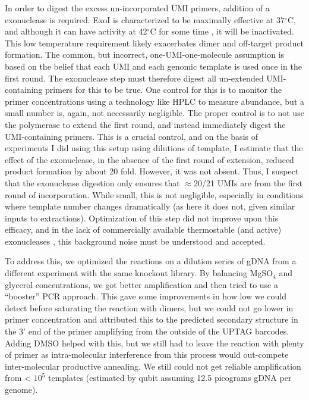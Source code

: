 In order to digest the
excess un-incorporated UMI primers, addition of a
exonuclease is required. 
ExoI is characterized to be maximally effective at
37\(^{\circ}\)C, and although it can have activity at 42\(^{\circ}\)C
for some time \parencite{fei2015structural}, it
will be inactivated. This low temperature requirement likely exacerbates
dimer and off-target product formation.
The common, but incorrect, one-UMI-one-molecule assumption is based on
the belief that each UMI and each genomic template is used once in the
first round. The exonuclease step must therefore digest all
un-extended UMI-containing primers for this to be true. One control
for this is to monitor the primer concentrations using a technology
like HPLC to measure abundance, but a small number is, again, not
necessarily negligible. The proper control is to not use the
polymerase to extend the first round, and instead immediately digest
the UMI-containing primers. This is a crucial control, and on the
basis of experiments I did using this setup using dilutions of
template, I estimate that the effect of the exonuclease, in the 
absence of the first round of extension, reduced product formation 
by about 20 fold. However, it was not absent. Thus, I suspect that 
the exonuclease digestion only ensures that $\approx$20/21 UMIs are
from the first round of incorporation. While small, this is not
negligible, especially in conditions where template number changes
dramatically (as here it does not, given similar inputs to extractions).
Optimization of this step did not improve upon this efficacy, and in
the lack of commercially available thermostable (and active) 
exonucleases \parencite{fei2015structural}, this background noise 
must be understood and accepted.

To address this, we optimized the reactions on a dilution series of gDNA
from a different experiment with the same knockout library. By balancing
MgSO\(_4\) and glycerol concentrations, we got better amplification and
then tried to use a ``booster'' \parencite{ruano1989biphasic} PCR approach. 
This gave some improvements in how low we
could detect before saturating the reaction with dimers, but we could
not go lower in primer concentration and attributed this to the
predicted secondary structure in the 3' end of the primer amplifying
from the outside of the UPTAG barcodes. Adding DMSO helped with this,
but we still had to leave the reaction with plenty of primer as
intra-molecular interference from this process would out-compete
inter-molecular productive annealing. We still could not get reliable
amplification from \textless{} \(10^5\) templates (estimated by qubit
assuming 12.5 picograms gDNA per genome).

